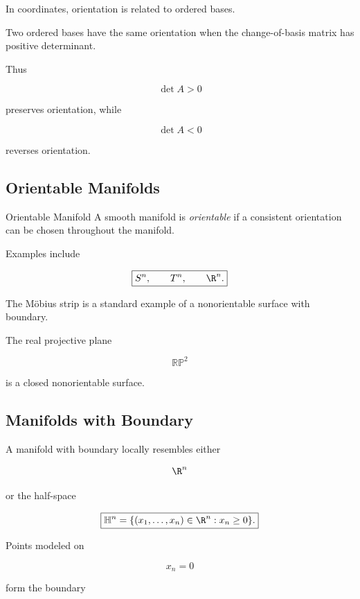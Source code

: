 In coordinates, orientation is related to ordered bases.

Two ordered bases have the same orientation when the change-of-basis matrix
has positive determinant.

Thus

\[
\boxed{
\det A>0
}
\]

preserves orientation, while

\[
\boxed{
\det A<0
}
\]

reverses orientation.

\subsection{Orientable Manifolds}
\label{subsec:orientable-manifolds}

\begin{definitionbox}{Orientable Manifold}
A smooth manifold is \emph{orientable} if a consistent orientation can be
chosen throughout the manifold.
\end{definitionbox}

Examples include

\[
\boxed{
S^n,
\qquad
T^n,
\qquad
\R^n.
}
\]

The M\"obius strip is a standard example of a nonorientable surface with
boundary.

The real projective plane

\[
\mathbb{RP}^2
\]

is a closed nonorientable surface.

\subsection{Manifolds with Boundary}
\label{subsec:manifolds-with-boundary-differential}

A manifold with boundary locally resembles either

\[
\R^n
\]

or the half-space

\[
\boxed{
\mathbb{H}^n
=
\{
(x_1,\ldots,x_n)\in\R^n:x_n\geq0
\}.
}
\]

Points modeled on

\[
x_n=0
\]

form the boundary

